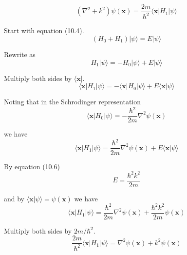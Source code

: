 


\begin{equation*}
(\nabla^2+k^2)\psi(\mathbf x)=\frac{2m}{\hbar^2}
\langle\mathbf x|H_1|\psi\rangle
\tag{10.5}
\end{equation*}

Start with equation (10.4).
\begin{equation*}
(H_0+H_1)|\psi\rangle=E|\psi\rangle
\end{equation*}

Rewrite as
\begin{equation*}
H_1|\psi\rangle=-H_0|\psi\rangle+E|\psi\rangle
\end{equation*}

Multiply both sides by $\langle\mathbf x|$.
\begin{equation*}
\langle\mathbf x|H_1|\psi\rangle=-\langle\mathbf x|H_0|\psi\rangle+E\langle\mathbf x|\psi\rangle
\end{equation*}

Noting that in the Schrodinger representation
\begin{equation*}
\langle\mathbf x|H_0|\psi\rangle=-\frac{\hbar^2}{2m}\nabla^2\psi(\mathbf x)
\end{equation*}

we have
\begin{equation*}
\langle\mathbf x|H_1|\psi\rangle=\frac{\hbar^2}{2m}\nabla^2\psi(\mathbf x)
+E\langle\mathbf x|\psi\rangle
\end{equation*}

By equation (10.6)
\begin{equation*}
E=\frac{\hbar^2k^2}{2m}\tag{10.6}
\end{equation*}

and by $\langle\mathbf x|\psi\rangle=\psi(\mathbf x)$ we have
\begin{equation*}
\langle\mathbf x|H_1|\psi\rangle=\frac{\hbar^2}{2m}\nabla^2\psi(\mathbf x)
+\frac{\hbar^2k^2}{2m}\psi(\mathbf x)
\end{equation*}

Multiply both sides by $2m/\hbar^2$.
\begin{equation*}
\frac{2m}{\hbar^2}\langle\mathbf x|H_1|\psi\rangle=\nabla^2\psi(\mathbf x)+k^2\psi(\mathbf x)
\end{equation*}


